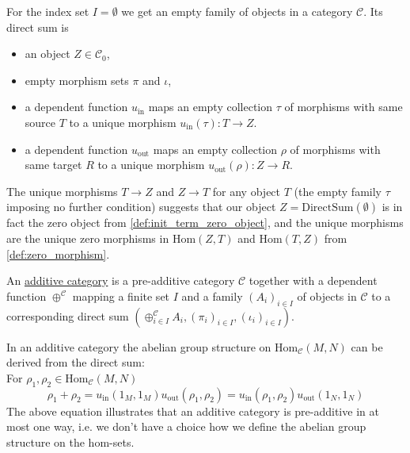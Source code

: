 \begin{example}\label{ex:sum_of_empty}
For the index set $I = \emptyset$ we get an empty family of objects in a category $\mathcal{C}$. Its direct sum is
\begin{itemize}
\item an object $Z \in \mathcal{C}_{0}$,
\item empty morphism sets $\pi$ and $\iota$,
\item a dependent function $u_{\text{in}}$ maps an empty collection $\tau$ of morphisms with same source $T$ to a unique
morphism $u_{\text{in}}(\tau) : T \rightarrow Z$.
\item a dependent function $u_{\text{out}}$ maps an empty collection $\rho$ of morphisms with same target $R$ to a unique
morphism $u_{\text{out}}(\rho) : Z \rightarrow R$.
\end{itemize}
The unique morphisms $T \rightarrow Z$ and $Z \rightarrow T$ for any object $T$ (the empty family $\tau$ imposing no further condition)
suggests that our object $Z = \mathrm{DirectSum}(\emptyset)$ is in fact the zero object from \ref{def:init_term_zero_object}, and the
unique morphisms are the unique zero morphisms in $\mathrm{Hom}(Z,T)$ and $\mathrm{Hom}(T,Z)$ from \ref{def:zero_morphism}.
\end{example}

\begin{definition}\label{def:additive_category}
An \ul{additive category} is a pre-additive category $\mathcal{C}$ together with a dependent function $\oplus^{\mathcal{C}}$ mapping
a finite set $I$ and a family $(A_{i})_{i\in I}$ of objects in $\mathcal{C}$ to a corresponding direct sum $(\oplus_{i\in I}^{\mathcal{C}} A_{i},
(\pi_{i})_{i\in I}, (\iota_{i})_{i\in I})$.
\end{definition}

\begin{remark}\label{rmk:addition_derived_from_direct_sum}
In an additive category the abelian group structure on $\mathrm{Hom}_{\mathcal{C}}(M,N)$ can be derived from the direct sum:\\
For $\rho_{1}, \rho_{2} \in \mathrm{Hom}_{\mathcal{C}}(M,N)$
\[
\rho_{1} + \rho_{2} = u_{\mathrm{in}}(1_{M},1_{M}) u_{\mathrm{out}}(\rho_{1},\rho_{2}) 
= u_{\mathrm{in}}(\rho_{1},\rho_{2}) u_{\mathrm{out}}(1_{N},1_{N})
\]
The above equation illustrates that an additive category is
pre-additive in at most one way, i.e. we don't have a choice how we define the abelian group structure on the hom-sets.
\end{remark}

